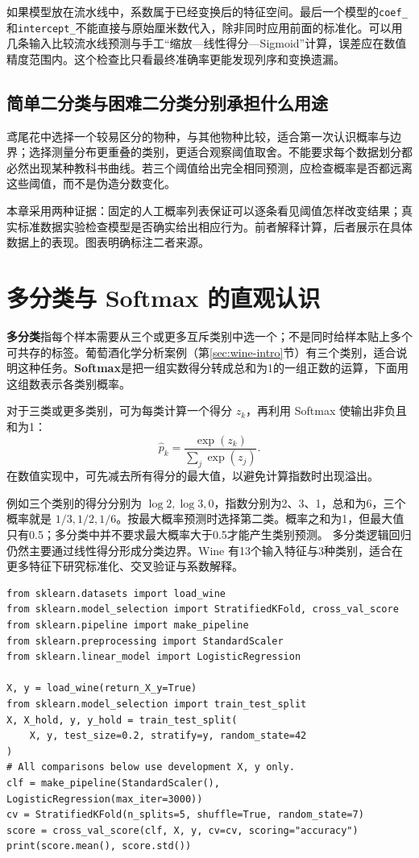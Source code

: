 如果模型放在流水线中，系数属于已经变换后的特征空间。最后一个模型的\texttt{coef\_}和\texttt{intercept\_}不能直接与原始厘米数代入，除非同时应用前面的标准化。可以用几条输入比较流水线预测与手工“缩放—线性得分—Sigmoid”计算，误差应在数值精度范围内。这个检查比只看最终准确率更能发现列序和变换遗漏。

\subsection{简单二分类与困难二分类分别承担什么用途}
鸢尾花中选择一个较易区分的物种，与其他物种比较，适合第一次认识概率与边界；选择测量分布更重叠的类别，更适合观察阈值取舍。不能要求每个数据划分都必然出现某种教科书曲线。若三个阈值给出完全相同预测，应检查概率是否都远离这些阈值，而不是伪造分数变化。

本章采用两种证据：固定的人工概率列表保证可以逐条看见阈值怎样改变结果；真实标准数据实验检查模型是否确实给出相应行为。前者解释计算，后者展示在具体数据上的表现。图表明确标注二者来源。

\section{多分类与 Softmax 的直观认识}

\textbf{多分类}指每个样本需要从三个或更多互斥类别中选一个；不是同时给样本贴上多个可共存的标签。葡萄酒化学分析案例（第\ref{sec:wine-intro}节）有三个类别，适合说明这种任务。\textbf{Softmax}是把一组实数得分转成总和为1的一组正数的运算，下面用这组数表示各类别概率。

对于三类或更多类别，可为每类计算一个得分 $z_k$，再利用 Softmax 使输出非负且和为1：
\begin{equation}
\hat p_k=\frac{\exp(z_k)}{\sum_j\exp(z_j)}.
\end{equation}
在数值实现中，可先减去所有得分的最大值，以避免计算指数时出现溢出。

例如三个类别的得分分别为 $\log2,\log3,0$，指数分别为2、3、1，总和为6，三个概率就是 $1/3,1/2,1/6$。按最大概率预测时选择第二类。概率之和为1，但最大值只有0.5；多分类中并不要求最大概率大于0.5才能产生类别预测。
多分类逻辑回归仍然主要通过线性得分形成分类边界。Wine 有13个输入特征与3种类别，适合在更多特征下研究标准化、交叉验证与系数解释。

\begin{lstlisting}[caption={葡萄酒类别的逻辑回归与交叉验证}]
from sklearn.datasets import load_wine
from sklearn.model_selection import StratifiedKFold, cross_val_score
from sklearn.pipeline import make_pipeline
from sklearn.preprocessing import StandardScaler
from sklearn.linear_model import LogisticRegression

X, y = load_wine(return_X_y=True)
from sklearn.model_selection import train_test_split
X, X_hold, y, y_hold = train_test_split(
    X, y, test_size=0.2, stratify=y, random_state=42
)
# All comparisons below use development X, y only.
clf = make_pipeline(StandardScaler(), LogisticRegression(max_iter=3000))
cv = StratifiedKFold(n_splits=5, shuffle=True, random_state=7)
score = cross_val_score(clf, X, y, cv=cv, scoring="accuracy")
print(score.mean(), score.std())
\end{lstlisting}

